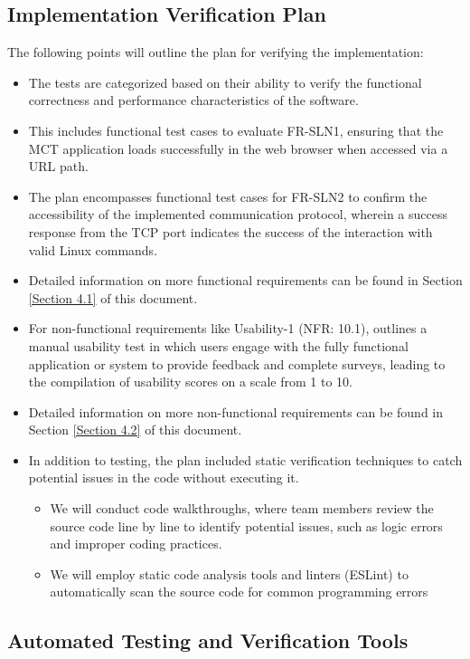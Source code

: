 \documentclass[12pt, titlepage]{article}
\begin{document}
\subsection{Implementation Verification Plan}

The following points will outline the plan for verifying the implementation:
\begin{itemize}
    \item The tests are categorized based on their ability to verify the functional correctness and performance characteristics of the software.
    \item This includes functional test cases to evaluate FR-SLN1, ensuring that the MCT application loads successfully in the web browser when accessed via a URL path.
    \item The plan encompasses functional test cases for FR-SLN2 to confirm the accessibility of the implemented communication protocol, wherein a success response from the TCP port indicates the success of the interaction with valid Linux commands. 
    \item Detailed information on more functional requirements can be found in Section \ref{Section 4.1} of this document.
    \item For non-functional requirements like Usability-1 (NFR: 10.1), outlines a manual usability test in which users engage with the fully functional application or system to provide feedback and complete surveys, leading to the compilation of usability scores on a scale from 1 to 10.
    \item Detailed information on more non-functional requirements can be found in Section \ref{Section 4.2} of this document.
    \item In addition to testing, the plan included static verification techniques to catch potential issues in the code without executing it. 
    \begin{itemize}
        \item We will conduct code walkthroughs, where team members review the source code line by line to identify potential issues, such as logic errors and improper coding practices.
        \item We will employ static code analysis tools and linters (ESLint) to automatically scan the source code for common programming errors 
    \end{itemize}
\end{itemize}


\subsection{Automated Testing and Verification Tools}
\end{document}
